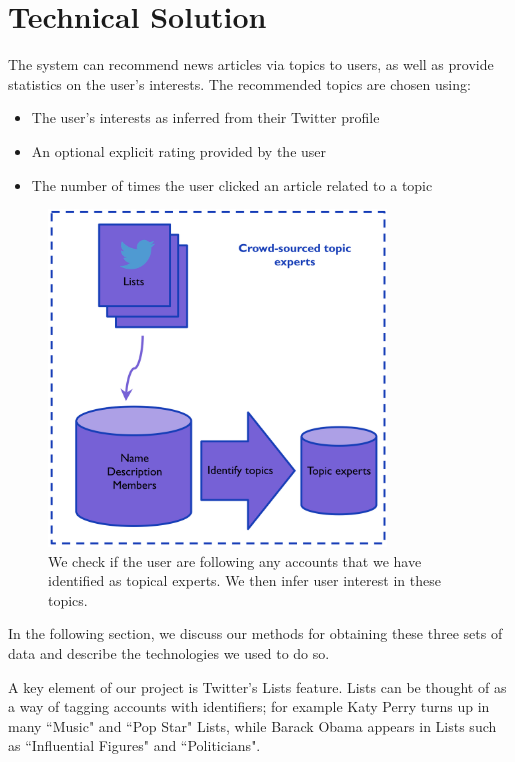 \documentclass[11pt]{article}
\begin{document}
\section{Technical Solution}
The system can recommend news articles via topics to users, as well as provide statistics on the user's interests. The recommended topics are chosen using: 
\begin{itemize} 
    \item The user's interests as inferred from their Twitter profile
    \item An optional explicit rating provided by the user 
    \item The number of times the user clicked an article related to a topic 
\end{itemize}
\begin{figure}[h!]
\centering
	\includegraphics[width=0.8\textwidth]{./IMG/topic_experts.PNG}
	\caption{We check if the user are following any accounts that we have identified as topical experts. We then infer user interest in these topics.}

\end{figure}

In the following section, we discuss our methods for obtaining these three sets of data and describe the technologies we used to do so. 

A key element of our project is Twitter's Lists feature. Lists can be thought of as a way of tagging accounts with identifiers; for example Katy Perry turns up in many ``Music" and ``Pop Star" Lists, while Barack Obama appears in Lists such as ``Influential Figures" and ``Politicians". 
\end{document}
